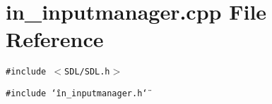 \section{in\_\-inputmanager.cpp File Reference}
\label{in__inputmanager_8cpp}
{\tt \#include $<$SDL/SDL.h$>$}\par
{\tt \#include \char`\"{}in\_\-inputmanager.h\char`\"{}}\par
